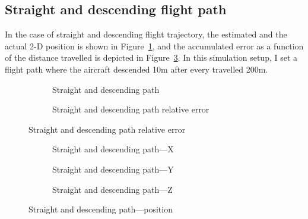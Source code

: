 \subsection{Straight and descending flight path}

In the case of straight and descending flight trajectory, the estimated and the actual 2-D position is shown in Figure~\ref{fig:straight-descending}, and the accumulated error as a function of the distance travelled is depicted in Figure~\ref{fig:straight-descending-error}. In this simulation setup, I set a flight path where the aircraft descended 10\si{\meter} after every travelled 200\si{\meter}. 

\begin{figure}[H]
    \centering
    \begin{subfigure}{0.45\textwidth}
        
        \caption{Straight and descending path}\label{fig:straight-descending}
    \end{subfigure}
    \begin{subfigure}{0.45\textwidth}
        
        \caption{Straight and descending path relative error}\label{fig:straight-descending-error}
    \end{subfigure}
\end{figure}

\begin{figure}[H]
    \centering
    \begin{subfigure}{0.3\textwidth}
        
        \caption{Straight and descending path---X}
    \end{subfigure}
    \hfill
    \begin{subfigure}{0.3\textwidth}
        
        \caption{Straight and descending path---Y}
    \end{subfigure}
    \hfill
    \begin{subfigure}{0.3\textwidth}
        
        \caption{Straight and descending path---Z}
    \end{subfigure}
    \caption{Straight and descending path---position}\label{fig:straight-descending-pos}
\end{figure}

